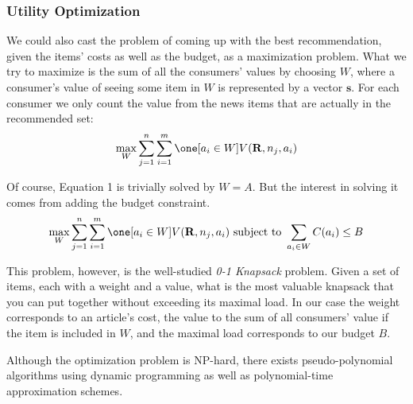 \documentclass{article}
\begin{document}
\subsubsection{Utility Optimization}
We could also cast the problem of coming up with the best recommendation, given the items' costs as well as the budget, as a maximization problem. What we try to maximize is the sum of all the consumers' values by choosing $W$, where a consumer's value of seeing some item in $W$ is represented by a vector $\boldsymbol{s}$. For each consumer we only count the value from the news items that are actually in the recommended set:\\
\begin{equation}
\max_W \sum_{j=1}^n \sum_{i=1}^m \one [a_i\in W] V(\mathbf{R}, n_j, a_i)
\end{equation}

Of course, Equation 1 is trivially solved by $W=A$. But the interest in solving it comes from adding the budget constraint.
\begin{equation}
\max_W \sum_{j=1}^n \sum_{i=1}^m \one [a_i\in W] V(\mathbf{R}, n_j, a_i) \text{ subject to } \sum_{a_i \in W} C(a_i) \leq B
\end{equation}

This problem, however, is the well-studied {\em 0-1 Knapsack} problem. Given a set of items, each with a weight and a value, what is the most valuable knapsack that you can put together without exceeding its maximal load. In our case the weight corresponds to an article's cost, the value to the sum of all consumers' value if the item is included in $W$, and the maximal load corresponds to our budget $B$. 

Although the optimization problem is NP-hard, there exists pseudo-polynomial algorithms using dynamic programming as well as polynomial-time approximation schemes. 


\end{document}
